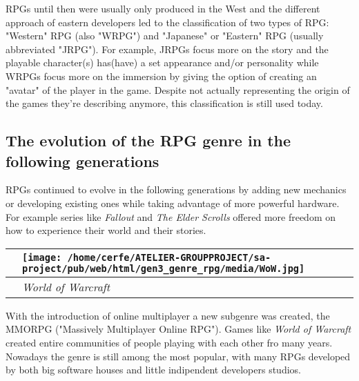\documentclass[a4paper,10pt]{book}
\begin{document}
 
          RPGs until then were usually only produced in the West and the different approach of eastern developers led to the classification of two types of RPG:
          "Western" RPG (also "WRPG") and "Japanese" or "Eastern" RPG (usually abbreviated "JRPG"). For example, JRPGs focus more on the story and the playable character(s) has(have) a set appearance
          and/or personality while WRPGs focus more on the immersion by giving the option of creating an "avatar" of the player in the game.
          Despite not actually representing the origin of the games they're describing anymore, this classification is still used today.
         
 
 \subsection{The evolution of the RPG genre in the following generations }
 
 
          RPGs continued to evolve in the following generations by adding new mechanics or developing existing ones while taking advantage of more powerful hardware.
          For example series like  \textit{Fallout } and  \textit{The Elder Scrolls } offered more freedom on how to experience their world and their stories.  
 
 
 \begin{longtable}{p{1mm}|l|}\hline
 
 & \texttt{[image: /home/cerfe/ATELIER-GROUPPROJECT/sa-project/pub/web/html/gen3\_genre\_rpg/media/WoW.jpg]}
 \\\hline
 
 & \textit{World of Warcraft }
 \\\hline
 \end{longtable}
 
 
          With the introduction of online multiplayer a new subgenre was created, the MMORPG ("Massively Multiplayer Online RPG"). Games like  \textit{World of Warcraft }
          created entire communities of people playing with each other fro many years.  
          Nowadays the genre is still among the most popular, with many RPGs developed by both big software houses and little indipendent developers studios.
         
 
\end{document}
